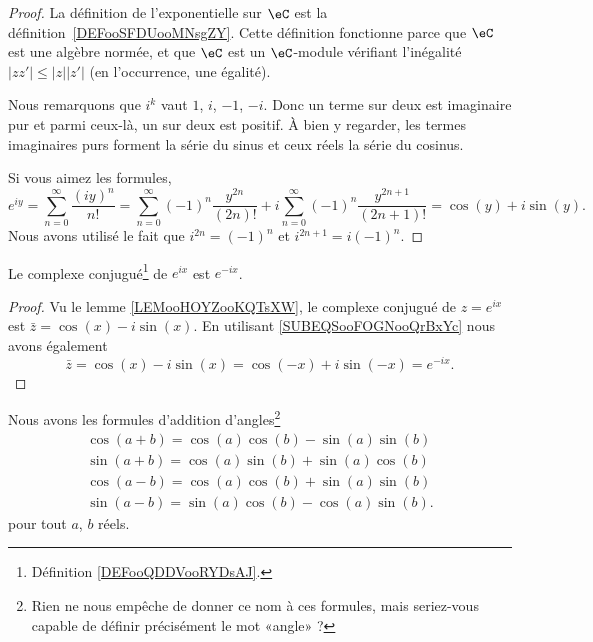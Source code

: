 \begin{proof}
	La définition de l'exponentielle sur \( \eC\) est la définition~\ref{DEFooSFDUooMNsgZY}. Cette définition fonctionne parce que \( \eC\) est une algèbre normée, et que \( \eC\) est un \( \eC\)-module vérifiant l'inégalité \(  | zz' |\leq | z | |z' | \) (en l'occurrence, une égalité).

	Nous remarquons que \( i^k\) vaut \( 1\), \( i\), \( -1\), \( -i\). Donc un terme sur deux est imaginaire pur et parmi ceux-là, un sur deux est positif. À bien y regarder, les termes imaginaires purs forment la série du sinus et ceux réels la série du cosinus.

	Si vous aimez les formules,
	\begin{equation}
		e^{iy}=\sum_{n=0}^{\infty}\frac{ (iy)^n }{ n! }
		=\sum_{n=0}^{\infty}(-1)^n\frac{ y^{2n} }{ (2n)! }+i\sum_{n=0}^{\infty}(-1)^n\frac{ y^{2n+1} }{ (2n+1)! }
		=\cos(y)+i\sin(y).
	\end{equation}
	Nous avons utilisé le fait que \( i^{2n}=(-1)^n\) et \( i^{2n+1}=i(-1)^n\).
\end{proof}

\begin{corollary}       \label{CORooWZFIooDTCoRo}
	Le complexe conjugué\footnote{Définition \ref{DEFooQDDVooRYDsAJ}.} de \(  e^{ix}\) est \(  e^{-ix}\).
\end{corollary}

\begin{proof}
	Vu le lemme \ref{LEMooHOYZooKQTsXW}, le complexe conjugué de \(  z=e^{ix}\) est \(\bar z= \cos(x)-i\sin(x)\). En utilisant \eqref{SUBEQSooFOGNooQrBxYc} nous avons également
	\begin{equation}
		\bar z=\cos(x)-i\sin(x)=\cos(-x)+i\sin(-x)= e^{-ix}.
	\end{equation}
\end{proof}

\begin{lemma}       \label{LEMooJAWBooJGfZIL}
	Nous avons les formules d'addition d'angles\footnote{Rien ne nous empêche de donner ce nom à ces formules, mais seriez-vous capable de définir précisément le mot «angle» ?}
	\begin{subequations}        \label{SUBEQSooFSSMooHcYwRc}
		\begin{align}
			\cos(a+b)=\cos(a)\cos(b)-\sin(a)\sin(b) \label{EQooJYEMooQaOMib} \\
			\sin(a+b)=\cos(a)\sin(b)+\sin(a)\cos(b) \label{EQooECAUooQzckDv} \\
			\cos(a-b)=\cos(a)\cos(b)+\sin(a)\sin(b) \label{EQooCVZAooQfocya} \\
			\sin(a-b)=\sin(a)\cos(b)-\cos(a)\sin(b).
		\end{align}
	\end{subequations}
	pour tout \( a\), \( b\) réels.
\end{lemma}

